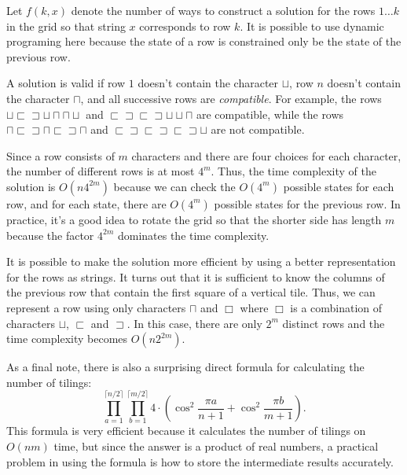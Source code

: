 Let $f(k,x)$ denote the number of ways to
construct a solution for the rows $1 \ldots k$
in the grid so that string $x$ corresponds to row $k$.
It is possible to use dynamic programing here
because the state of a row is constrained
only be the state of the previous row.

A solution is valid if row $1$ doesn't contain
the character $\sqcup$,
row $n$ doesn't contain the character $\sqcap$,
and all successive rows are \emph{compatible}.
For example, the rows
$\sqcup \sqsubset \sqsupset \sqcup \sqcap \sqcap \sqcup$ and
$\sqsubset \sqsupset \sqsubset \sqsupset \sqcup \sqcup \sqcap$ 
are compatible, while the rows
$\sqcap \sqsubset \sqsupset \sqcap \sqsubset \sqsupset \sqcap$ and
$\sqsubset \sqsupset \sqsubset \sqsupset \sqsubset \sqsupset \sqcup$
are not compatible.

Since a row consists of $m$ characters and there are
four choices for each character, the number of different
rows is at most $4^m$.
Thus, the time complexity of the solution is
$O(n 4^{2m})$ because we can check the
$O(4^m)$ possible states for each row,
and for each state, there are $O(4^m)$
possible states for the previous row.
In practice, it's a good idea to rotate the grid
so that the shorter side has length $m$
because the factor $4^{2m}$ dominates the time complexity.

It is possible to make the solution more efficient
by using a better representation for the rows as strings.
It turns out that it is sufficient to know the
columns of the previous row that contain the first square
of a vertical tile.
Thus, we can represent a row using only characters
$\sqcap$ and $\Box$ where $\Box$ is a combination
of characters
$\sqcup$, $\sqsubset$ and $\sqsupset$.
In this case, there are only
$2^m$ distinct rows and the time complexity becomes
$O(n 2^{2m})$.

As a final note, there is also a surprising direct formula
for calculating the number of tilings:
\[ \prod_{a=1}^{\lceil n/2 \rceil} \prod_{b=1}^{\lceil m/2 \rceil} 4 \cdot (\cos^2 \frac{\pi a}{n + 1} + \cos^2 \frac{\pi b}{m+1}).\]
This formula is very efficient because it calculates
the number of tilings on $O(nm)$ time,
but since the answer is a product of real numbers,
a practical problem in using the formula is
how to store the intermediate results accurately.



